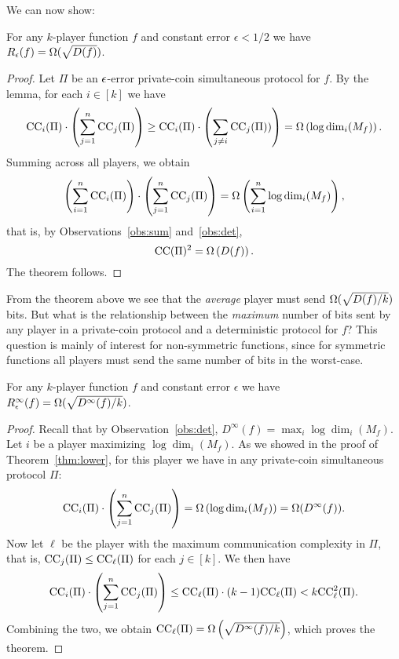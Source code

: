 We can now show:
\begin{theorem}
	For any $k$-player function $f$ and constant error $\epsilon < 1/2$
	we have $R_\epsilon(f) = \Omega( \sqrt{ D(f) })$.
	\label{thm:lower}
\end{theorem}
\begin{proof}
	Let $\Pi$ be an $\epsilon$-error private-coin simultaneous protocol for $f$.
	By the lemma, for each $i \in [k]$ we have
	\begin{equation*}
		\mathrm{CC}_i(\Pi) \cdot \left(\sum_{j=1}^n \mathrm{CC}_j(\Pi)\right)
		\geq 
		\mathrm{CC}_i(\Pi) \cdot \left(\sum_{j \neq i} \mathrm{CC}_j(\Pi)) \right) = \Omega \left( \log \dim_i(M_f) \right).
	\end{equation*}
	Summing across all players, we obtain
	\begin{equation*}
		\left(\sum_{i=1}^n \mathrm{CC}_i(\Pi)\right) \cdot \left(\sum_{j=1}^n \mathrm{CC}_j(\Pi) \right) = \Omega\left( \sum_{i=1}^n \log \dim_i (M_f) \right),
	\end{equation*}
	that is, by Observations~\ref{obs:sum} and~\ref{obs:det},
	\begin{equation*}
		\mathrm{CC}(\Pi)^2 = \Omega \left( D(f) \right).
	\end{equation*}
	The theorem follows.
\end{proof}

From the theorem above we see that the \emph{average} player must send $\Omega(\sqrt{D(f)/k})$ bits.
But what is the relationship between the \emph{maximum} number of bits sent by any player in a private-coin
protocol and a deterministic protocol for $f$? 
This question is mainly of interest for non-symmetric functions, since for symmetric functions all players must send
the same number of bits in the worst-case.

\begin{theorem}
	For any $k$-player function $f$ and constant error $\epsilon$
	we have $R_\epsilon^\infty(f) = \Omega( \sqrt{ D^\infty(f)/k })$.
\end{theorem}
\begin{proof}
	Recall that by Observation~\ref{obs:det}, $D^\infty(f) = \max_i \log \dim_i(M_f)$.
	Let $i$ be a player maximizing $\log \dim_i(M_f)$.
	As we showed in the proof of Theorem~\ref{thm:lower},
	for this player we have in any private-coin simultaneous protocol $\Pi$:
	\begin{equation*}
		\mathrm{CC}_i(\Pi) \cdot \left(\sum_{j=1}^n \mathrm{CC}_j(\Pi)\right)
		=
		\Omega \left( \log \dim_i(M_f) \right)
		=
		\Omega( D^\infty(f) )
		.
	\end{equation*}
	Now let $\ell$ be the player with the maximum communication complexity in $\Pi$,
	that is, $\mathrm{CC}_j(\Pi) \leq \mathrm{CC}_\ell(\Pi)$ for each $j \in [k]$. We then have
	\begin{equation*}
		\mathrm{CC}_i(\Pi) \cdot \left(\sum_{j=1}^n \mathrm{CC}_j(\Pi)\right)
		\leq \mathrm{CC}_\ell(\Pi) \cdot (k-1)\mathrm{CC}_\ell(\Pi)
		< k\mathrm{CC}^2_\ell(\Pi).
	\end{equation*}
	Combining the two, we obtain
		$\mathrm{CC}_\ell(\Pi) = \Omega\left( \sqrt{ D^\infty(f) / k} \right)$,
	which proves the theorem.
\end{proof}

